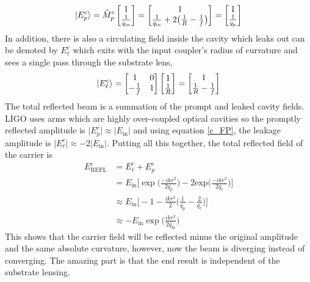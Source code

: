 		\begin{equation}
		 \ket{E^{c}_{p}}=
		 \hat{M}^{c}_{p}
		 \begin{bmatrix}
		 					1  
		 \\ 	\frac{1}{q_{\text{in}}}
		 \end{bmatrix}
		 =
		 \begin{bmatrix}
		 1  
		 \\ 	\frac{1}{q_{\text{in}}} + 2 \big(\frac{1}{R} - \frac{1}{f}\big)
		 \end{bmatrix}
		 =
		 \begin{bmatrix}
		 1  
		 \\ 	\frac{1}{q_{\text{p}}}
		 \end{bmatrix}
		\end{equation}
		In addition, there is also a circulating field inside the cavity which leaks out can be denoted by $E^c_{\ell}$ which exits with the input coupler's radius of curvature and sees a single pass through the substrate lens,
		\begin{equation}
		\ket{E^c_{\ell}} = 		 
		\begin{bmatrix}
		1 	&	0 
		\\ 	-\frac{1}{f} 	&	1
		\end{bmatrix}
		\begin{bmatrix}
		1  
		\\ 	\frac{1}{R}
		\end{bmatrix}
		=
		\begin{bmatrix}
		1  
		\\ 	\frac{1}{R} - \frac{1}{f}
		\end{bmatrix}
		\end{equation}
		The total reflected beam is a summation of the prompt and leaked cavity fields.  LIGO uses arms which are highly over-coupled optical cavities so the promptly reflected amplitude is $\vert E^c_p \vert \approx \vert E_{\text{in}} \vert$ and using equation \ref{c_FP}, the leakage amplitude is $\vert E^c_\ell \vert \approx -2\vert E_{\text{in}} \vert$.  Putting all this together, the total reflected field of the carrier is
		\begin{equation}
		\begin{aligned}
		E^c_{\text{REFL}} 	&= E^c_{\ell} + E^c_p \\
							&= E_{\text{in}} \bigg[ \exp \bigg(\frac{-ik r^2}{2q_p}\bigg) - 2  \text{exp} \bigg(\frac{-ik r^2}{2q_{\ell}}\bigg) \bigg]\\
							&\approx E_{\text{in}} \bigg[ -1 - \frac{ikr^2}{2} \bigg( \frac{1}{q_p} - \frac{2}{q_\ell} \bigg) \bigg]\\
							&\approx -E_{\text{in}} \exp\bigg(\frac{ikr^2}{2q_{\text{in}}}\bigg) 
		\end{aligned} 
		\end{equation}
		This shows that the carrier field will be reflected minus the original amplitude and the same absolute curvature, however, now the beam is diverging instead of converging.  The amazing part is that the end result is independent of the substrate lensing.
		
